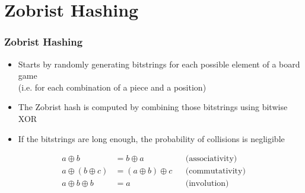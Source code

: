 \documentclass[lualatex,professionalfonts,aspectratio=169,usepdftitle=false,xcolor={dvipsnames}]{beamer}
\begin{document}
\section{Zobrist Hashing}
\begin{frame}
    \frametitle{Zobrist Hashing}


    \begin{itemize}
        \item Starts by randomly generating bitstrings for each possible element of a board game\\(i.e. for each combination of a piece and a position)
        \item The Zobrist hash is computed by combining those bitstrings using bitwise XOR
        \item If the bitstrings are long enough, the probability of collisions is negligible
    \end{itemize}
    \bigskip{}

    \begin{align*}
        a \oplus b &= b \oplus a & & \text{(associativity)}\\
        a \oplus (b \oplus c) &= (a \oplus b) \oplus c & & \text{(commutativity)}\\
        a \oplus b \oplus b &= a & & \text{(involution)}
    \end{align*}
\end{frame}
\end{document}
